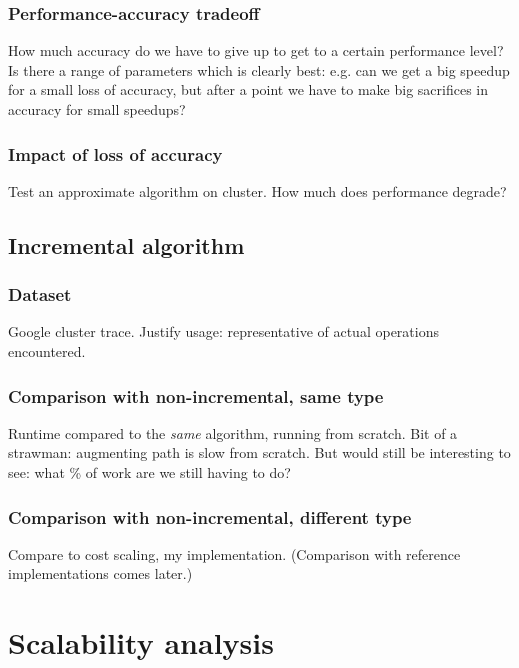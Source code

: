\subsubsection{Performance-accuracy tradeoff}

How much accuracy do we have to give up to get to a certain performance level? Is there a range of parameters which is clearly best: e.g. can we get a big speedup for a small loss of accuracy, but after a point we have to make big sacrifices in accuracy for small speedups?

\subsubsection{Impact of loss of accuracy}

Test an approximate algorithm on cluster. How much does performance degrade?

\subsection{Incremental algorithm}

\subsubsection{Dataset}

Google cluster trace. Justify usage: representative of actual operations encountered.

\subsubsection{Comparison with non-incremental, same type}

Runtime compared to the {\it same} algorithm, running from scratch. Bit of a strawman: augmenting path is slow from scratch. But would still be interesting to see: what \% of work are we still having to do?

\subsubsection{Comparison with non-incremental, different type}

Compare to cost scaling, my implementation. (Comparison with reference implementations comes later.)

\section{Scalability analysis}

